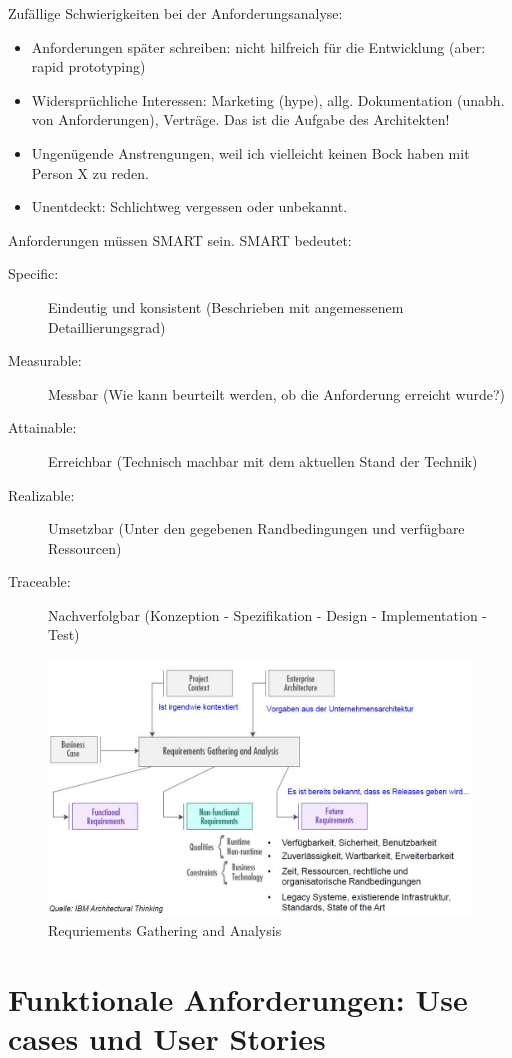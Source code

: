 Zufällige Schwierigkeiten bei der Anforderungsanalyse:
\begin{itemize}
	\item Anforderungen später schreiben: nicht hilfreich für die Entwicklung (aber: rapid prototyping)
	\item Widersprüchliche Interessen: Marketing (hype), allg. Dokumentation (unabh. von Anforderungen), Verträge. Das ist die Aufgabe des Architekten!
	\item Ungenügende Anstrengungen, weil ich vielleicht keinen Bock haben mit Person X zu reden.
	\item Unentdeckt: Schlichtweg vergessen oder unbekannt.
\end{itemize}

Anforderungen müssen SMART sein. SMART bedeutet:
\begin{description}
	\item[Specific:] Eindeutig und konsistent (Beschrieben mit angemessenem Detaillierungsgrad)
	\item[Measurable:] Messbar (Wie kann beurteilt werden, ob die Anforderung erreicht wurde?)
	\item[Attainable:] Erreichbar (Technisch machbar mit dem aktuellen Stand der Technik)
	\item[Realizable:] Umsetzbar (Unter den gegebenen Randbedingungen und verfügbare Ressourcen)
	\item[Traceable:] Nachverfolgbar (Konzeption - Spezifikation - Design - Implementation - Test)
\end{description}

\begin{figure}[h!]
\centering
\includegraphics[width=0.75\linewidth]{fig/requirements-gathering-and-analysis}
\caption{Requriements Gathering and Analysis}
\label{fig:requirements-gathering-and-analysis}
\end{figure}

\section{Funktionale Anforderungen: Use cases und User Stories}
\label{sec:funktionale-anforderungen}

